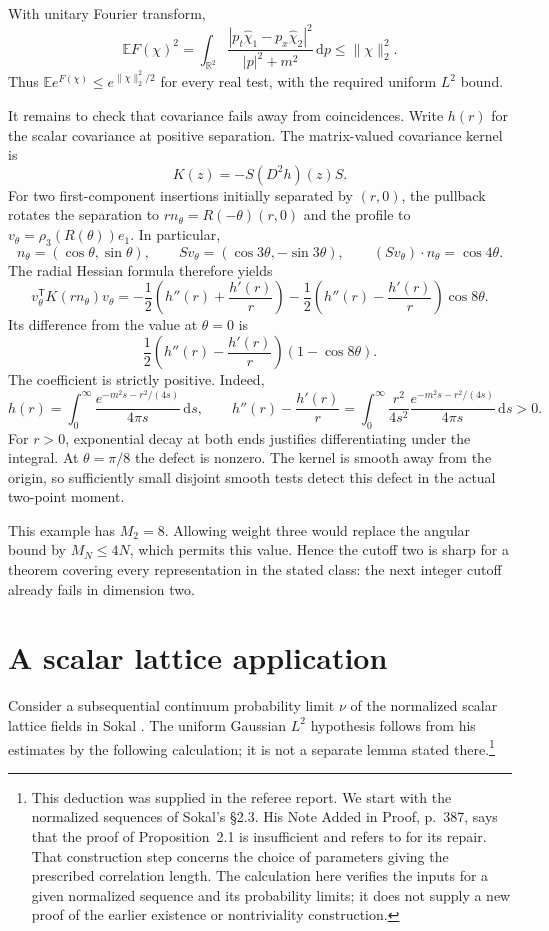 \documentclass[11pt, letterpaper, reqno]{amsart}
\theoremstyle{definition}
\theoremstyle{remark}
\newcommand{\bbE}{\mathbb{E}}
\newcommand{\bbR}{\mathbb{R}}
\newcommand{\dd}{\,\mathrm{d}}
\begin{document}
With unitary Fourier transform,
\[
 \bbE F(\chi)^2
 =\int_{\bbR^2}
 \frac{|p_t\widehat\chi_1-p_x\widehat\chi_2|^2}
 {|p|^2+m^2}\dd p
 \leq\|\chi\|_2^2.
\]
Thus $\bbE e^{F(\chi)}\leq e^{\|\chi\|_2^2/2}$ for every real
test, with the required uniform $L^2$ bound.

It remains to check that covariance fails away from coincidences.
Write $h(r)$ for the scalar covariance at positive separation. The
matrix-valued covariance kernel is
\[
 K(z)=-S(D^2h)(z)S.
\]
For two first-component insertions initially separated by $(r,0)$,
the pullback rotates the separation to $r n_\theta=R(-\theta)(r,0)$
and the profile to $v_\theta=\rho_3(R(\theta))e_1$. In particular,
\[
 n_\theta=(\cos\theta,\sin\theta),\qquad
 S v_\theta=(\cos3\theta,-\sin3\theta),\qquad
 (S v_\theta)\cdot n_\theta=\cos4\theta.
\]
The radial Hessian formula therefore yields
\[
 v_\theta^{\mathsf T}K(rn_\theta)v_\theta
 =-\frac12\left(h''(r)+\frac{h'(r)}r\right)
  -\frac12\left(h''(r)-\frac{h'(r)}r\right)\cos8\theta.
\]
Its difference from the value at $\theta=0$ is
\[
 \frac12\left(h''(r)-\frac{h'(r)}r\right)(1-\cos8\theta).
\]
The coefficient is strictly positive. Indeed,
\[
 h(r)=\int_0^\infty
       \frac{e^{-m^2s-r^2/(4s)}}{4\pi s}\dd s,
 \qquad
 h''(r)-\frac{h'(r)}r
 =\int_0^\infty\frac{r^2}{4s^2}
       \frac{e^{-m^2s-r^2/(4s)}}{4\pi s}\dd s>0.
\]
For $r>0$, exponential decay at both ends justifies differentiating
under the integral. At $\theta=\pi/8$ the defect is nonzero.
The kernel is smooth away from the origin, so sufficiently small
disjoint smooth tests detect this defect in the actual two-point
moment.

This example has $M_2=8$. Allowing weight three would replace the
angular bound by $M_N\leq4N$, which permits this value. Hence the
cutoff two is sharp for a theorem covering every representation in
the stated class: the next integer cutoff already fails in dimension
two.

\section{A scalar lattice application}\label{sec:scalar-application}

Consider a subsequential continuum probability limit $\nu$ of the
normalized scalar lattice fields in Sokal
\cite[\S2.3, Lemma~2.2 and Corollary~2.3]{Sokal}. The uniform Gaussian
$L^2$ hypothesis follows from his estimates by the following calculation;
it is not a separate lemma stated there.\footnote{This deduction was
supplied in the referee report. We start with the normalized sequences
of Sokal's \S2.3. His Note Added in Proof, p.~387, says that the proof
of Proposition~2.1 is insufficient and refers to
\cite[Proposition~5.1]{BFS} for its repair. That construction step
concerns the choice of parameters giving the prescribed correlation
length. The calculation here verifies the inputs for a given normalized
sequence and its probability limits; it does not supply a new proof of
the earlier existence or nontriviality construction.}
\end{document}
